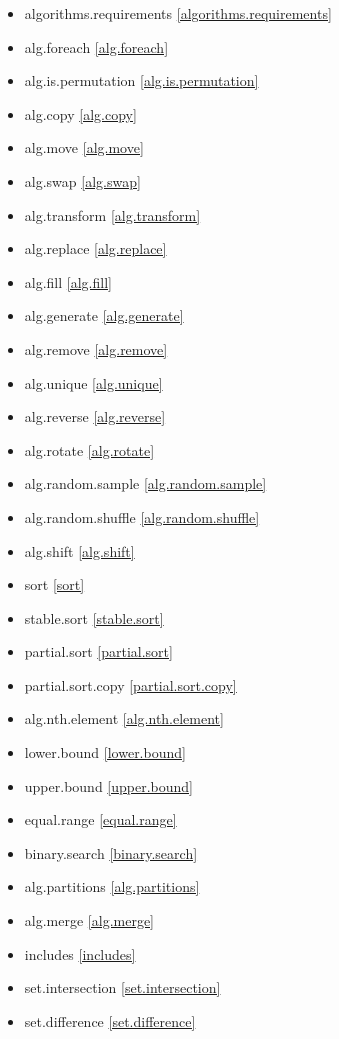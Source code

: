 \begin{multicols}{3}
\begin{itemize}
\item{algorithms.requirements}		\ref{algorithms.requirements}
\item{alg.foreach}					\ref{alg.foreach}
\item{alg.is.permutation}			\ref{alg.is.permutation}
\item{alg.copy}						\ref{alg.copy}
\item{alg.move}						\ref{alg.move}
\item{alg.swap}						\ref{alg.swap}
\item{alg.transform}				\ref{alg.transform}
\item{alg.replace}					\ref{alg.replace}
\item{alg.fill}						\ref{alg.fill}
\item{alg.generate}					\ref{alg.generate}
\item{alg.remove}					\ref{alg.remove}
\item{alg.unique}					\ref{alg.unique}
\item{alg.reverse}					\ref{alg.reverse}
\item{alg.rotate}					\ref{alg.rotate}
\item{alg.random.sample}			\ref{alg.random.sample}
\item{alg.random.shuffle}			\ref{alg.random.shuffle}
\item{alg.shift}					\ref{alg.shift}
\item{sort}							\ref{sort}
\item{stable.sort}					\ref{stable.sort}
\item{partial.sort}					\ref{partial.sort}
\item{partial.sort.copy}			\ref{partial.sort.copy}
\item{alg.nth.element}				\ref{alg.nth.element}
\item{lower.bound}					\ref{lower.bound}
\item{upper.bound}					\ref{upper.bound}
\item{equal.range}					\ref{equal.range}
\item{binary.search}				\ref{binary.search}
\item{alg.partitions}				\ref{alg.partitions}
\item{alg.merge}					\ref{alg.merge}
\item{includes}						\ref{includes}
\item{set.intersection}				\ref{set.intersection}
\item{set.difference}				\ref{set.difference}

\end{itemize}
\end{multicols}
